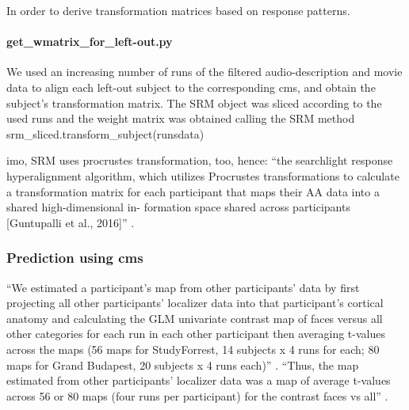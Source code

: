 
In order to derive transformation matrices based on response patterns.

\paragraph{get\_wmatrix\_for\_left-out.py}

We used an increasing number of runs of the filtered audio-description and movie
data to align each left-out subject to the corresponding \ac{cms}, and obtain
the subject's transformation matrix.
%
The SRM object was sliced according to the used runs and the weight matrix was
obtained calling the SRM method srm\_sliced.transform\_subject(runsdata)

imo, SRM uses procrustes transformation, too, hence: ``the searchlight response
hyperalignment algorithm, which utilizes Procrustes transformations to calculate
a transformation matrix for each participant that maps their AA data into a
shared high-dimensional in- formation space shared across participants
[Guntupalli et al., 2016]'' \citep{busch2021hybrid}.


\subsubsection{Prediction using \ac{cms}}

%
``We estimated a participant's map from other participants' data by first
projecting all other participants' localizer data into that participant's
cortical anatomy and calculating the GLM univariate contrast map of faces versus
all other categories for each run in each other participant then averaging
t-values across the maps (56 maps for StudyForrest, 14 subjects x 4 runs for
each; 80 maps for Grand Budapest, 20 subjects x 4 runs each)''
\citep{jiahui2020predicting}.
%
``Thus, the map estimated from other participants' localizer data was a map of
average t-values across 56 or 80 maps (four runs per participant) for the
contrast faces vs all'' \citep{jiahui2020predicting}.

